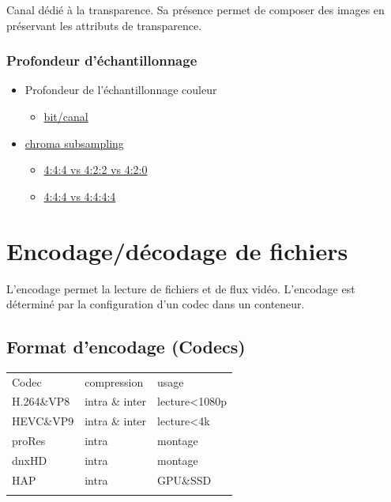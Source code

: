 \documentclass[
  french,
]{book}
\providecommand{\tightlist}{%
  \setlength{\itemsep}{0pt}\setlength{\parskip}{0pt}}
\begin{document}
Canal dédié à la transparence.
Sa présence permet de composer des images en préservant les attributs de transparence.

\hypertarget{profondeur-duxe9chantillonnage}{%
\subsubsection{Profondeur d'échantillonnage}\label{profondeur-duxe9chantillonnage}}

\begin{itemize}
\tightlist
\item
  Profondeur de l'échantillonnage couleur

  \begin{itemize}
  \tightlist
  \item
    \href{https://en.wikipedia.org/wiki/Color_depth}{bit/canal}\\
  \end{itemize}
\item
  \href{https://en.wikipedia.org/wiki/Chroma_subsampling\#Sampling_systems_and_ratios}{chroma subsampling}

  \begin{itemize}
  \tightlist
  \item
    \href{https://upload.wikimedia.org/wikipedia/commons/0/06/Colorcomp.jpg}{4:4:4 vs 4:2:2 vs 4:2:0}
  \item
    \href{https://en.wikipedia.org/wiki/Alpha_compositing}{4:4:4 vs 4:4:4:4}
  \end{itemize}
\end{itemize}

\hypertarget{lexique_fichiers}{%
\section{Encodage/décodage de fichiers}\label{lexique_fichiers}}

L'encodage permet la lecture de fichiers et de flux vidéo.
L'encodage est déterminé par la configuration d'un codec dans un conteneur.

\hypertarget{format-dencodage-codecs}{%
\subsection{Format d'encodage (Codecs)}\label{format-dencodage-codecs}}

\begin{longtable}[]{@{}lll@{}}
\toprule
Codec & compression & usage \\ \addlinespace
\midrule
\endhead
H.264\&VP8 & intra \& inter & lecture\textless1080p \\ \addlinespace
HEVC\&VP9 & intra \& inter & lecture\textless4k \\ \addlinespace
proRes & intra & montage \\ \addlinespace
dnxHD & intra & montage \\ \addlinespace
HAP & intra & GPU\&SSD \\ \addlinespace
\bottomrule
\end{longtable}
\end{document}
